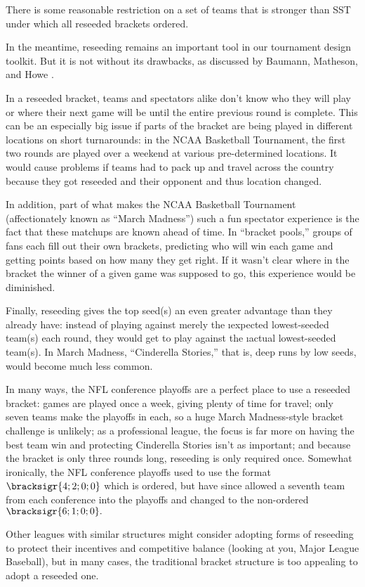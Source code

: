 {\begin{conj}{}{}
    There is some reasonable restriction on a set of teams that is stronger than SST under which all reseeded brackets ordered.
\end{conj}

In the meantime, reseeding remains an important tool in our tournament design toolkit. But it is not without its drawbacks, as discussed by Baumann, Matheson, and Howe \cite{reseeding_issues}. 

In a reseeded bracket, teams and spectators alike don't know who they will play or where their next game will be until the entire previous round is complete. This can be an especially big issue if parts of the bracket are being played in different locations on short turnarounds: in the NCAA Basketball Tournament, the first two rounds are played over a weekend at various pre-determined locations. It would cause problems if teams had to pack up and travel across the country because they got reseeded and their opponent and thus location changed.

In addition, part of what makes the NCAA Basketball Tournament (affectionately known as ``March Madness'') such a fun spectator experience is the fact that these matchups are known ahead of time. In ``bracket pools,'' groups of fans each fill out their own brackets, predicting who will win each game and getting points based on how many they get right. If it wasn't clear where in the bracket the winner of a given game was supposed to go, this experience would be diminished.

Finally, reseeding gives the top seed(s) an even greater advantage than they already have: instead of playing against merely the \i{expected} lowest-seeded team(s) each round, they would get to play against the \i{actual} lowest-seeded team(s). In March Madness, ``Cinderella Stories,'' that is, deep runs by low seeds, would become much less common.

In many ways, the NFL conference playoffs are a perfect place to use a reseeded bracket: games are played once a week, giving plenty of time for travel; only seven teams make the playoffs in each, so a huge March Madness-style bracket challenge is unlikely; as a professional league, the focus is far more on having the best team win and protecting Cinderella Stories isn't as important; and because the bracket is only three rounds long, reseeding is only required once. Somewhat ironically, the NFL conference playoffs used to use the format $\bracksigr{4;2;0;0}$ which is ordered, but have since allowed a seventh team from each conference into the playoffs and changed to the non-ordered $\bracksigr{6;1;0;0}.$ 

Other leagues with similar structures might consider adopting forms of reseeding to protect their incentives and competitive balance (looking at you, Major League Baseball), but in many cases, the traditional bracket structure is too appealing to adopt a reseeded one.
}